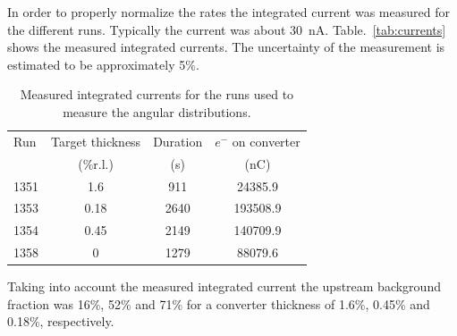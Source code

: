 In order to properly normalize the rates the integrated current was measured for the different 
runs. Typically the current was about 30~nA. Table.~\ref{tab:currents} shows the measured integrated currents.  The uncertainty of the measurement is estimated to be approximately 5\%. 
\begin{table}
\centering
\begin{tabular}{l|c|c|c}
Run & Target thickness & Duration &  $e^-$ on converter \\
 &  (\%r.l.) & (s) & (nC)    \\   
\hline\hline
1351 & 1.6   & 911 &     24385.9     \\
\hline
1353 & 0.18   & 2640 &    193508.9  \\
\hline
1354 & 0.45  & 2149 &       140709.9  \\
\hline
1358 & 0    & 1279  &   88079.6  \\
\hline
\end{tabular}
\caption{{\small Measured integrated currents for the runs used to measure the angular distributions.}}
\end{table}
Taking into account the measured integrated current 
the upstream background fraction was 16\%, 52\% and 71\% 
for a converter thickness of 1.6\%, 0.45\% and 0.18\%, respectively. 

